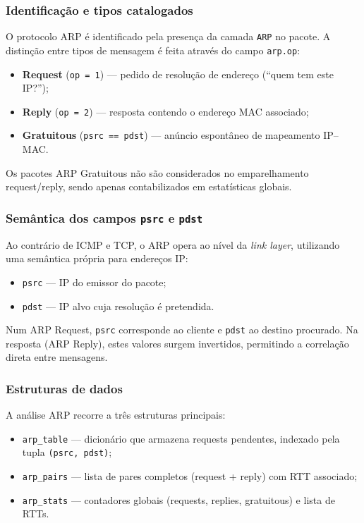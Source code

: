 \documentclass[a4paper,12pt]{article}
\begin{document}
\subsubsection{Identificação e tipos catalogados}

O protocolo ARP é identificado pela presença da camada \texttt{ARP} no pacote.  
A distinção entre tipos de mensagem é feita através do campo \texttt{arp.op}:

\begin{itemize}
    \item \textbf{Request} (\texttt{op = 1}) — pedido de resolução de endereço (``quem tem este IP?'');
    \item \textbf{Reply} (\texttt{op = 2}) — resposta contendo o endereço MAC associado;
    \item \textbf{Gratuitous} (\texttt{psrc == pdst}) — anúncio espontâneo de mapeamento IP–MAC.
\end{itemize}

Os pacotes ARP Gratuitous não são considerados no emparelhamento request/reply, sendo apenas contabilizados em estatísticas globais.

\subsubsection{Semântica dos campos \texttt{psrc} e \texttt{pdst}}

Ao contrário de ICMP e TCP, o ARP opera ao nível da \textit{link layer}, utilizando uma semântica própria para endereços IP:

\begin{itemize}
    \item \texttt{psrc} — IP do emissor do pacote;
    \item \texttt{pdst} — IP alvo cuja resolução é pretendida.
\end{itemize}

Num ARP Request, \texttt{psrc} corresponde ao cliente e \texttt{pdst} ao destino procurado.  
Na resposta (ARP Reply), estes valores surgem invertidos, permitindo a correlação direta entre mensagens.

\subsubsection{Estruturas de dados}

A análise ARP recorre a três estruturas principais:

\begin{itemize}
    \item \texttt{arp\_table} — dicionário que armazena requests pendentes, indexado pela tupla \texttt{(psrc, pdst)};
    \item \texttt{arp\_pairs} — lista de pares completos (request + reply) com RTT associado;
    \item \texttt{arp\_stats} — contadores globais (requests, replies, gratuitous) e lista de RTTs.
\end{itemize}
\end{document}
